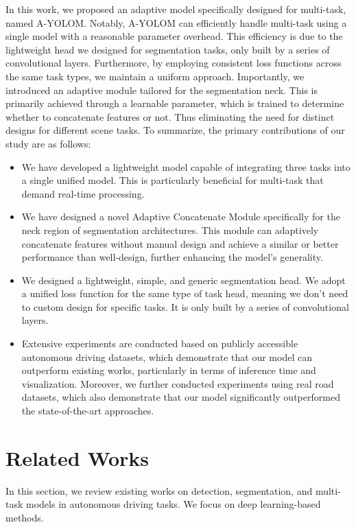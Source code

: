 \documentclass[lettersize,journal]{IEEEtran}
\begin{document}
In this work, we proposed an adaptive model specifically designed for multi-task, named A-YOLOM. Notably, A-YOLOM can efficiently handle multi-task using a single model with a reasonable parameter overhead. This efficiency is due to the lightweight head we designed for segmentation tasks, only built by a series of convolutional layers. Furthermore, by employing consistent loss functions across the same task types, we maintain a uniform approach. Importantly, we introduced an adaptive module tailored for the segmentation neck. This is primarily achieved through a learnable parameter, which is trained to determine whether to concatenate features or not. Thus eliminating the need for distinct designs for different scene tasks. To summarize, the primary contributions of our study are as follows:
\begin{itemize}
  \item We have developed a lightweight model capable of integrating three tasks into a single unified model. This is particularly beneficial for multi-task that demand real-time processing. 
  \item We have designed a novel Adaptive Concatenate Module specifically for the neck region of segmentation architectures. This module can adaptively concatenate features without manual design and achieve a similar or better performance than well-design, further enhancing the model's generality.
  \item We designed a lightweight, simple, and generic segmentation head. We adopt a unified loss function for the same type of task head, meaning we don't need to custom design for specific tasks. It is only built by a series of convolutional layers.
  \item Extensive experiments are conducted based on publicly accessible autonomous driving datasets, which demonstrate that our model can outperform existing works, particularly in terms of inference time and visualization. Moreover, we further conducted experiments using real road datasets, which also demonstrate that our model significantly outperformed the state-of-the-art approaches.
\end{itemize}





\section{Related Works}
\label{sec: Related Works}
In this section, we review existing works on detection, segmentation, and multi-task models in autonomous driving tasks. We focus on deep learning-based methods. 
\end{document}
